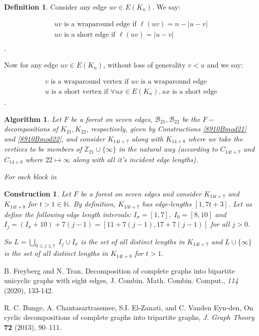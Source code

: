 \documentclass[addpoints,11pt]{exam}
\newtheorem{const}[theorem]{Construction}
\newtheorem{algo}[theorem]{Algorithm}
\theoremstyle{definition}
\newtheorem{definition}[theorem]{Definition}
\newcommand{\BB}{\ensuremath{\mathcal{B}}}
\newcommand{\ZZ}{\ensuremath{\mathbb{Z}}}
\newcommand{\NN}{\ensuremath{\mathbb{N}}}
\begin{document}
\begin{definition}
  Consider any edge $uv\in E(K_{n})$. We say:

  \begin{align}
  uv\text{ is a wraparound edge if }\ell(uv)=n-|u-v|\\
  uv\text{ is a short edge if }\ell(uv)=|u-v|\\
  \end{align}.

  Now for any edge $uv\in E(K_{n})$, without loss of generality $v<u$ and we say:   

  \begin{align}
    v\text{ is a wraparound vertex if }uv\text{ is a wraparound edge}\\
    u\text{ is a short vertex if }\forall ux\in E(K_{n}), ux\text{ is a short edge}
  \end{align}.

  
\end{definition}

\begin{algo}
Let $F$ be a forest on seven edges, $\BB_{21},\BB_{22}$ be the $F-$decompositions of $K_{21},K_{22}$, respectively, given by Constructions \ref{8910Bmod21} and \ref{8910Bmod22}, and consider $K_{14t+7}$ along with $K_{14+8}$ where we take the vertices to be members of $\ZZ_{21}\cup \{\infty\}$ in the natural way (according to $C_{14t+7}$ and $C_{14+8}$ where $22 \mapsto \infty$ along with all it's incident edge lengths).

For each block in 
\end{algo}

\begin{const}
Let $F$ be a forest on seven edges and consider $K_{14t+7}$ and $K_{14t+8}$ for $t > 1\in \NN$. By definition, $K_{14t+7}$ has edge-lengths $[1,7t+3]$.
Let us define the following edge length intervals: $I_{\sigma}=[1,7],\;I_{0}=[8,10]$ and $I_{j}=(I_{\sigma}+10)+7(j-1)=[11+7(j-1),17+7(j-1)]$ for all $j>0$.

So $L=\bigcup\limits_{0\leq j\leq t}\;I_{j}\cup I_{\sigma}$ is the set of all distinct lengths in $K_{14t+7}$ and $L\cup \{\infty\}$ is the set of all distinct lengths in $K_{14t+8}$ for $t>1$. 
\end{const}

\begin{thebibliography}{99}

  B. Freyberg and N. Tran, Decomposition of complete graphs into bipartite unicyclic graphs with eight edges, J. Combin. Math. Combin. Comput., \emph{114} (2020), 133-142.

R. C. Bunge, A. Chantasartrassmee, S.I. El-Zanati, and C. Vanden Eyn-den, On cyclic decompositions of complete graphs into tripartite graphs, \emph{J. Graph Theory} \textbf{72} (2013), 90--111.

  \end{thebibliography}
\end{document}
